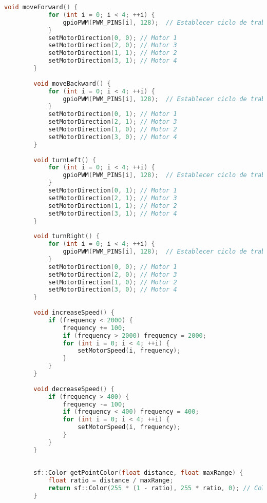\begin{lstlisting}[language={C++}, caption={Segundo ajuste de c\'odigo}, label={SegundoAjuste}]
        void moveForward() {
            for (int i = 0; i < 4; ++i) {
                gpioPWM(PWM_PINS[i], 128);  // Establecer ciclo de trabajo al 50%
            }
            setMotorDirection(0, 0); // Motor 1
            setMotorDirection(2, 0); // Motor 3
            setMotorDirection(1, 1); // Motor 2
            setMotorDirection(3, 1); // Motor 4
        }
        
        void moveBackward() {
            for (int i = 0; i < 4; ++i) {
                gpioPWM(PWM_PINS[i], 128);  // Establecer ciclo de trabajo al 50%
            }
            setMotorDirection(0, 1); // Motor 1
            setMotorDirection(2, 1); // Motor 3
            setMotorDirection(1, 0); // Motor 2
            setMotorDirection(3, 0); // Motor 4
        }
        
        void turnLeft() {
            for (int i = 0; i < 4; ++i) {
                gpioPWM(PWM_PINS[i], 128);  // Establecer ciclo de trabajo al 50%
            }
            setMotorDirection(0, 1); // Motor 1
            setMotorDirection(2, 1); // Motor 3
            setMotorDirection(1, 1); // Motor 2
            setMotorDirection(3, 1); // Motor 4
        }
        
        void turnRight() {
            for (int i = 0; i < 4; ++i) {
                gpioPWM(PWM_PINS[i], 128);  // Establecer ciclo de trabajo al 50%
            }
            setMotorDirection(0, 0); // Motor 1
            setMotorDirection(2, 0); // Motor 3
            setMotorDirection(1, 0); // Motor 2
            setMotorDirection(3, 0); // Motor 4
        }
        
        void increaseSpeed() {
            if (frequency < 2000) {
                frequency += 100;
                if (frequency > 2000) frequency = 2000;
                for (int i = 0; i < 4; ++i) {
                    setMotorSpeed(i, frequency);
                }
            }
        }
        
        void decreaseSpeed() {
            if (frequency > 400) {
                frequency -= 100;
                if (frequency < 400) frequency = 400;
                for (int i = 0; i < 4; ++i) {
                    setMotorSpeed(i, frequency);
                }
            }
        }
        
        
        sf::Color getPointColor(float distance, float maxRange) {
            float ratio = distance / maxRange;
            return sf::Color(255 * (1 - ratio), 255 * ratio, 0); // Color de rojo a verde
        }
        

\end{lstlisting}
